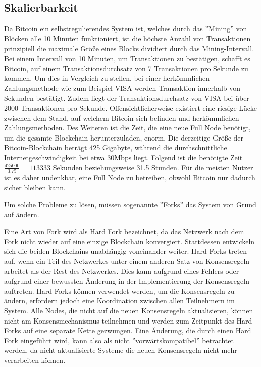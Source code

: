 \subsection{Skalierbarkeit}
Da Bitcoin ein selbstregulierendes System ist, welches durch das ''Mining'' von Blöcken alle 10 Minuten funktioniert, ist die
höchste Anzahl von Transaktionen prinzipiell die maximale Größe eines Blocks dividiert durch das Mining-Intervall. Bei einem
Intervall von 10 Minuten, um Transaktionen zu bestätigen, schafft es Bitcoin, auf einem Transaktionsdurchsatz von 7 Transaktionen 
pro Sekunde zu kommen. Um dies in Vergleich zu stellen, bei einer herkömmlichen Zahlungsmethode wie zum Beispiel VISA werden
Transaktion innerhalb von Sekunden bestätigt. Zudem liegt der Transaktionsdurchsatz von VISA bei über 2000 Transaktionen pro
Sekunde. Offensichtlicherweise existiert eine riesige Lücke zwischen dem Stand, auf welchem Bitcoin sich befinden und
herkömmlichen Zahlungsmethoden.  Des Weiteren ist die Zeit, die eine neue Full Node benötigt, um die gesamte 
Blockchain herunterzuladen, enorm. Die derzeitige Größe der Bitcoin-Blockchain beträgt 425 Gigabyte, während die
durchschnittliche Internetgeschwindigkeit bei etwa 30Mbps liegt. Folgend ist die benötigte Zeit \(\frac{425000}{3.75} = 113333\)
Sekunden beziehungsweise 31.5 Stunden. Für die meisten Nutzer ist es daher undenkbar, eine Full Node zu betreiben, obwohl Bitcoin
nur dadurch sicher bleiben kann. 

Um solche Probleme zu lösen, müssen sogenannte ''Forks'' das System von Grund auf ändern.

Eine Art von Fork wird als Hard Fork bezeichnet, da das Netzwerk nach dem Fork nicht wieder auf eine einzige Blockchain 
konvergiert. Stattdessen entwickeln sich die beiden Blockchains unabhängig voneinander weiter. Hard Forks treten auf, wenn ein 
Teil des Netzwerkes unter einem anderen Satz von Konsensregeln arbeitet als der Rest des Netzwerkes. Dies kann aufgrund eines
Fehlers oder aufgrund einer bewussten Änderung in der Implementierung der Konsensregeln auftreten. Hard Forks können verwendet
werden, um die Konsensregeln zu ändern, erfordern jedoch eine Koordination zwischen allen Teilnehmern im System. Alle Nodes,
die nicht auf die neuen Konsensregeln aktualisieren, können nicht am Konsensmechanismus teilnehmen und werden zum Zeitpunkt des
Hard Forks auf eine separate Kette gezwungen. Eine Änderung, die durch einen Hard Fork eingeführt wird, kann also als nicht
''vorwärtskompatibel'' betrachtet werden, da nicht aktualisierte Systeme die neuen Konsensregeln nicht mehr verarbeiten können.

